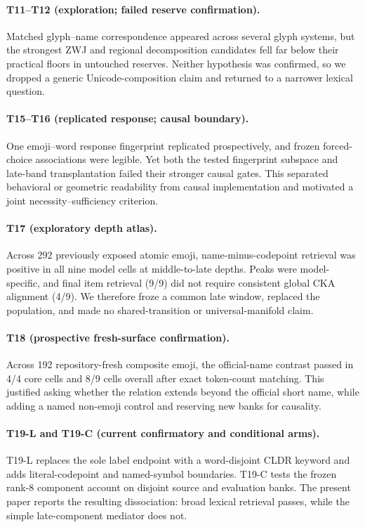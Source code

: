 \documentclass{article}
\begin{document}
\paragraph{T11--T12 (exploration; failed reserve confirmation).}
Matched glyph--name correspondence appeared across several glyph systems, but
the strongest ZWJ and regional decomposition candidates fell far below their
practical floors in untouched reserves. Neither hypothesis was confirmed, so
we dropped a generic Unicode-composition claim and returned to a narrower
lexical question.

\paragraph{T15--T16 (replicated response; causal boundary).}
One emoji--word response fingerprint replicated prospectively, and frozen
forced-choice associations were legible. Yet both the tested fingerprint
subspace and late-band transplantation failed their stronger causal gates.
This separated behavioral or geometric readability from causal
implementation and motivated a joint necessity--sufficiency criterion.

\paragraph{T17 (exploratory depth atlas).}
Across 292 previously exposed atomic emoji, name-minus-codepoint retrieval was
positive in all nine model cells at middle-to-late depths. Peaks were
model-specific, and final item retrieval (9/9) did not require consistent
global CKA alignment (4/9). We therefore froze a common late window, replaced
the population, and made no shared-transition or universal-manifold claim.

\paragraph{T18 (prospective fresh-surface confirmation).}
Across 192 repository-fresh composite emoji, the official-name contrast
passed in 4/4 core cells and 8/9 cells overall after exact token-count
matching. This justified asking whether the relation extends beyond the
official short name, while adding a named non-emoji control and reserving new
banks for causality.

\paragraph{T19-L and T19-C (current confirmatory and conditional arms).}
T19-L replaces the sole label endpoint with a word-disjoint CLDR keyword and
adds literal-codepoint and named-symbol boundaries. T19-C tests the frozen
rank-8 component account on disjoint source and evaluation banks. The present
paper reports the resulting dissociation: broad lexical retrieval passes,
while the simple late-component mediator does not.
\end{document}
